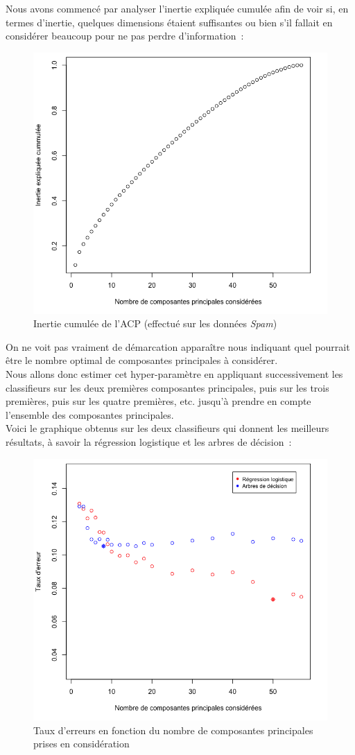 \documentclass[a4paper,10pt]{report}
\begin{document}
Nous avons commencé par analyser l'inertie expliquée cumulée afin de voir si, en termes d'inertie, quelques dimensions étaient suffisantes ou bien s'il fallait en considérer beaucoup pour ne pas perdre d'information~:
\begin{figure}[H]
	\centering
	\captionsetup{justification=centering, margin=2cm}
	\includegraphics[width=.6\linewidth]{img/3-3-ACP-scale-center-spam-inertie-cumulee}
	\caption{\small Inertie cumulée de l'ACP (effectué sur les données \textit{Spam})}
	\label{fig:3-3-ACP-scale-center-spam-inertie-cumulee}%
\end{figure}

On ne voit pas vraiment de démarcation apparaître nous indiquant quel pourrait être le nombre optimal de composantes principales à considérer.\\
Nous allons donc estimer cet hyper-paramètre en appliquant successivement les classifieurs sur les deux premières composantes principales, puis sur les trois premières, puis sur les quatre premières, etc. jusqu'à prendre en compte l'ensemble des composantes principales.\\

Voici le graphique obtenus sur les deux classifieurs qui donnent les meilleurs résultats, à savoir la régression logistique et les arbres de décision~:
\begin{figure}[H]
	\centering
	\captionsetup{justification=centering, margin=2cm}
	\includegraphics[width=.6\linewidth]{img/3-3-ACP-scale-center-spam-taux-erreur-fonction-nb-comp}
	\caption{\small Taux d'erreurs en fonction du nombre de composantes principales prises en considération}
	\label{3-3-ACP-scale-center-spam-taux-erreur-fonction-nb-comp}%
\end{figure}
\end{document}
